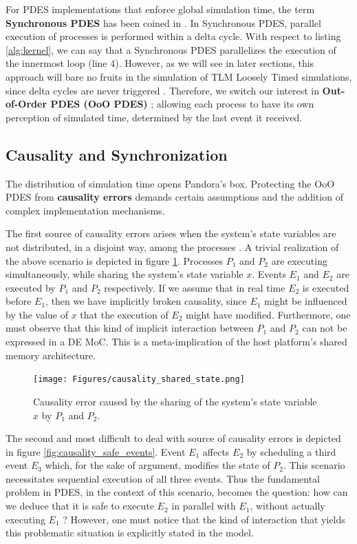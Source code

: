 \documentclass[12pt,twoside]{article}
\begin{document}
For PDES implementations that enforce global simulation time, the term \textbf{Synchronous PDES} has been coined in \cite{Schumacher2010}.
In Synchronous PDES, parallel execution of processes is performed within a delta cycle. 
With respect to listing \ref{alg:kernel}, we can say that a Synchronous PDES parallelizes the execution of the innermost loop (line 4).
However, as we will see in later sections, this approach will bare no fruits in the simulation of TLM Loosely Timed simulations, since delta cycles are never triggered \cite{Chen2012}.
Therefore, we switch our interest in \textbf{Out-of-Order PDES (OoO PDES)} \cite{Chen2015}; 
allowing each process to have its own perception of simulated time, determined by the last event it received.




\subsection{Causality and Synchronization}
\label{sec-4-5}
The distribution of simulation time opens Pandora's box. 
Protecting the OoO PDES from \textbf{causality errors} demands certain assumptions and the addition of complex implementation mechanisms.

The first source of causality errors arises when the system's state variables are not distributed, in a disjoint way, among the processes \cite{Fujimoto1990}.
A trivial realization of the above scenario is depicted in figure \ref{fig:causality_shared_state}. Processes $P_1$ and $P_2$ are executing simultaneously, while sharing the system's state variable $x$.
Events $E_1$ and $E_2$ are executed by $P_1$ and $P_2$ respectively. If we assume that in real time $E_2$ is executed before $E_1$, then we have implicitly broken causality, since $E_1$ might be influenced
by the value of $x$ that the execution of $E_2$ might have modified. Furthermore, one must observe that this kind of implicit interaction between $P_1$ and $P_2$ can not be expressed in a DE MoC. 
This is a meta-implication of the host platform's shared memory architecture.

\begin{figure}[H]
\centering
\texttt{[image: Figures/causality\_shared\_state.png]}
\caption{\label{fig:causality_shared_state}Causality error caused by the sharing of the system's state variable $x$ by $P_1$ and $P_2$.}
\end{figure}

The second and most difficult to deal with source of causality errors is depicted in figure \ref{fig:causality_safe_events}. 
Event $E_1$ affects $E_2$ by scheduling a third event $E_3$ which, for the sake of argument, modifies the state of $P_2$. 
This scenario necessitates sequential execution of all three events. 
Thus the fundamental problem in PDES, in the context of this scenario, becomes the question: how can we deduce that it is safe to execute $E_2$ in parallel with $E_1$, without actually executing $E_1$ \cite{Fujimoto1990}?
However, one must notice that the kind of interaction that yields this problematic situation is explicitly stated in the model.
\end{document}
